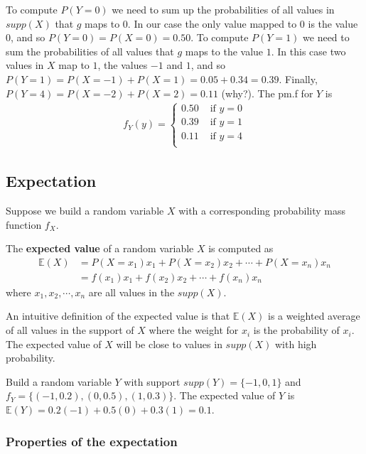 To compute $P(Y=0)$ we need to sum up the probabilities of all values in $supp(X)$ that $g$ maps to $0$. In our case the only value mapped to $0$ is the value $0$, and so $P(Y=0) = P(X=0) = 0.50$. 
To compute $P(Y=1)$ we need to sum the probabilities of all values that $g$ maps to the value $1$. In this case two values in $X$ map to $1$, the values $-1$ and $1$, and so $P(Y=1) = P(X=-1) + P(X=1) = 0.05+0.34=0.39$.
Finally,  $P(Y=4) = P(X=-2) + P(X=2) = 0.11$ (why?).
The pm.f for $Y$ is 
\begin{align}
    f_{Y}(y) = \begin{cases}
                  0.50 & \text{ if } y=0\\
                  0.39 & \text{ if } y=1\\
                  0.11 & \text{ if } y=4\\
               \end{cases}
\end{align}

\subsection{Expectation}

Suppose we build a random variable $X$ with a corresponding probability mass function $f_{X}$.  

The \textbf{expected value} of a random variable $X$ is computed as 
\begin{align}
    \mathbb{E}\left(X \right) &=
    P(X=x_{1})x_{1} +P(X=x_{2})x_{2} + \cdots + P(X=x_{n})x_{n}\\ 
    &= f(x_{1})x_{1} + f(x_{2})x_{2} + \cdots + f(x_{n})x_{n} 
\end{align}
where $x_{1},x_{2},\cdots,x_{n}$ are all values in the $supp(X)$.

An intuitive definition of the expected value is that $\mathbb{E}(X)$ is a weighted average of all values in the support of $X$ where the weight for $x_{i}$ is the probability of $x_{i}$.
The expected value of $X$ will be close to values in $supp(X)$ with high probability.

\ex Build a random variable $Y$ with support $supp(Y) = \{-1,0,1\}$ and $f_{Y} = \{(-1,0.2),(0,0.5),(1,0.3)\}$. The expected value of $Y$ is $\mathbb{E}(Y) = 0.2 (-1) + 0.5 (0) + 0.3 (1) = 0.1$.

\subsubsection{Properties of the expectation}

